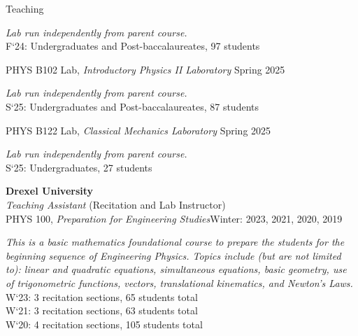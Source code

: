 \documentclass{resume} %
\newcommand{\forceindent}{\leavevmode{\parindent=1em\indent}}
\begin{document}
\begin{rSection}{Teaching}
\begin{description}[leftmargin=2em, style=nextline]
\vspace{-0.5em}
\item[~] \textit{Lab run independently from parent course.}\\
\forceindent\forceindent F`24: Undergraduates and Post-baccalaureates, 97 students
\end{description}
\forceindent PHYS B102 Lab, \textit{Introductory Physics II Laboratory} \hfill{Spring 2025}
\begin{description}[leftmargin=2em, style=nextline]
\vspace{-0.5em}
\item[~] \textit{Lab run independently from parent course.}\\
\forceindent\forceindent S`25: Undergraduates and Post-baccalaureates, 87 students
\end{description}
\forceindent PHYS B122 Lab, \textit{Classical Mechanics Laboratory} \hfill{Spring 2025}
\begin{description}[leftmargin=2em, style=nextline]
\vspace{-0.5em}
\item[~] \textit{Lab run independently from parent course.}\\
\forceindent\forceindent S`25: Undergraduates, 27 students
\end{description} 
\textbf{Drexel University} \\ 
\textit{Teaching Assistant} (Recitation and Lab Instructor)\\
\forceindent PHYS 100, \textit{Preparation for Engineering Studies}\hfill {Winter: 2023, 2021, 2020, 2019}
\begin{description}[leftmargin=2em, style=nextline]
\vspace{-0.5em}
\item[~] \textit{This is a basic mathematics foundational course to prepare the students for the beginning sequence of Engineering Physics. Topics include (but are not limited to): linear and quadratic equations, simultaneous equations, basic geometry, use of trigonometric functions, vectors, translational kinematics, and Newton’s Laws.} \\
\forceindent \forceindent W`23: 3 recitation sections, 65 students total\\
\forceindent \forceindent W`21: 3 recitation sections, 63 students total\\
\forceindent \forceindent W`20: 4 recitation sections, 105 students total\\

\end{description}
\end{rSection}
\end{document}
